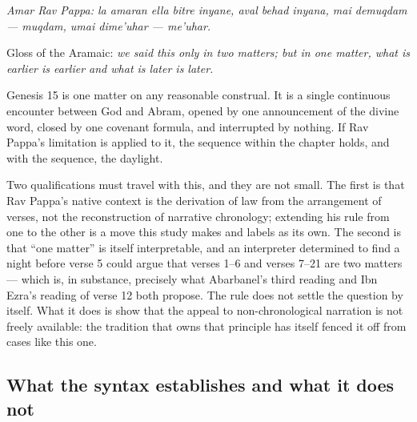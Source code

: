 \begin{studyframe}
\textit{Amar Rav Pappa: la amaran ella bitre inyane, aval behad inyana, mai
demuqdam --- muqdam, umai dime'uhar --- me'uhar.}
\end{studyframe}

\noindent Gloss of the Aramaic: \emph{we said this only in two matters; but in
one matter, what is earlier is earlier and what is later is later.}

Genesis 15 is one matter on any reasonable construal. It is a single continuous
encounter between God and Abram, opened by one announcement of the divine word,
closed by one covenant formula, and interrupted by nothing. If Rav Pappa's
limitation is applied to it, the sequence within the chapter holds, and with the
sequence, the daylight.

Two qualifications must travel with this, and they are not small. The first is
that Rav Pappa's native context is the derivation of law from the arrangement of
verses, not the reconstruction of narrative chronology; extending his rule from
one to the other is a move this study makes and labels as its own. The second is
that ``one matter'' is itself interpretable, and an interpreter determined to
find a night before verse 5 could argue that verses 1--6 and verses 7--21 are
two matters --- which is, in substance, precisely what Abarbanel's third
reading and Ibn Ezra's reading of verse 12 both propose. The rule does not
settle the question by itself. What it does is show that the appeal to
non-chronological narration is not freely available: the tradition that owns
that principle has itself fenced it off from cases like this one.

\subsection{What the syntax establishes and what it does not}

